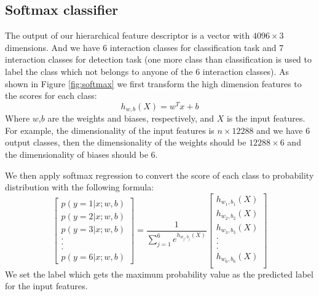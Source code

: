 \subsection{Softmax classifier}
The output of our hierarchical feature descriptor is a vector with \(4096 \times 3\) dimensions. And we have 6 interaction classes for classification task and 7 interaction classes for detection task (one more class than classification is used to label the class which not belongs to anyone of the 6 interaction classes). As shown in Figure \ref{fig:softmax} we first transform the high dimension features to the scores for each class: 
\begin{equation}
	h_{w,b}(X) = w^Tx + b
\end{equation}
Where \(w\),\(b\) are the weights and biases, respectively, and \(X\) is the input features. For example, the dimensionality of the input features is \(n \times 12288\) and we have 6 output classes, then the dimensionality of the weights should be \(12288 \times 6\) and the dimensionality of biases should be \(6\). 
\par 
We then apply softmax regression to convert the score of each class to probability distribution with the following formula:
\begin{equation}
	\left[
	\begin{matrix}
		p(y=1|x;w,b) \\
		p(y=2|x;w,b) \\
		p(y=3|x;w,b) \\
		. \\
		. \\
		. \\
		p(y=6|x;w,b)
	\end{matrix}
	\right] = \frac{1}{\sum_{j=1}^6 e^{h_{w_j,b_j}(X)}} \left[
	\begin{matrix}
		h_{w_1,b_1}(X) \\
		h_{w_2,b_2}(X) \\
		h_{w_3,b_3}(X) \\
		.\\
		.\\
		.\\
		h_{w_6,b_6}(X) \\		
	\end{matrix}
	\right]
\end{equation} 
We set the label which gets the maximum probability value as the predicted label for the input features. 
